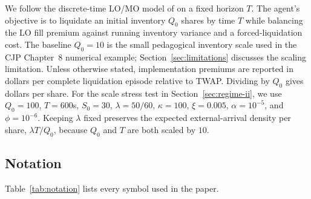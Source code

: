 \documentclass[]{interact}
\theoremstyle{plain}
\theoremstyle{definition}
\theoremstyle{remark}
\newcommand{\1}[1]{\mathbf{1}_{\{#1\}}}
\begin{document}
We follow the discrete-time LO/MO model of \citet[Chapter 8]{cjp2015} on a fixed horizon $T$. The agent's objective is to liquidate an initial inventory $Q_0$ shares by time $T$ while balancing the LO fill premium against running inventory variance and a forced-liquidation cost.
The baseline $Q_0=10$ is the small pedagogical inventory scale used in the CJP Chapter~8 numerical example; Section~\ref{sec:limitations} discusses the scaling limitation.
Unless otherwise stated, implementation premiums are reported in dollars per complete liquidation episode relative to TWAP. Dividing by $Q_0$ gives dollars per share.
For the scale stress test in Section~\ref{sec:regime-ii}, we use $Q_0=100$, $T=600$s, $S_0=30$, $\lambda=50/60$, $\kappa=100$, $\xi=0.005$, $\alpha=10^{-5}$, and $\phi=10^{-6}$. Keeping $\lambda$ fixed preserves the expected external-arrival density per share, $\lambda T/Q_0$, because $Q_0$ and $T$ are both scaled by $10$.

\subsection{Notation}\label{sec:notation}
Table~\ref{tab:notation} lists every symbol used in the paper.
\end{document}
